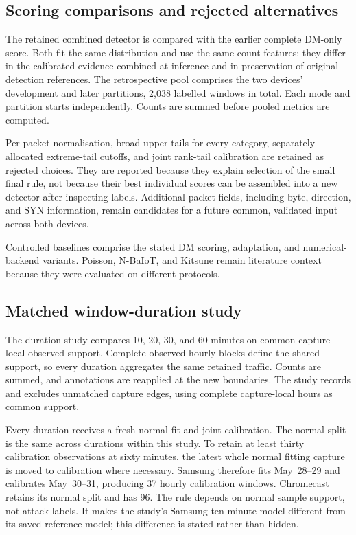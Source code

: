 \subsection{Scoring comparisons and rejected alternatives}

The retained combined detector is compared with the earlier complete
DM-only score. Both fit the same distribution and use the same count
features; they differ in the calibrated evidence combined at inference
and in preservation of original detection references. The retrospective
pool comprises the two devices' development and later partitions,
2,038 labelled windows in total. Each mode and partition starts
independently. Counts are summed before pooled metrics are computed.

Per-packet normalisation, broad upper tails for every category,
separately allocated extreme-tail cutoffs, and joint rank-tail calibration
are retained as rejected choices. They are reported because they explain
selection of the small final rule, not because their best individual
scores can be assembled into a new detector after inspecting labels.
Additional packet fields, including byte, direction, and SYN information,
remain candidates for a future common, validated input across both devices.

Controlled baselines comprise the stated DM scoring, adaptation, and
numerical-backend variants. Poisson, N-BaIoT, and Kitsune remain literature
context because they were evaluated on different protocols.

\subsection{Matched window-duration study}

The duration study compares 10, 20, 30, and 60 minutes on common
capture-local observed support. Complete observed hourly blocks define
the shared support, so every duration aggregates the same retained traffic.
Counts are summed, and annotations are reapplied at the new boundaries.
The study records and excludes unmatched capture edges, using complete
capture-local hours as common support.

Every duration receives a fresh normal fit and joint calibration. The
normal split is the same across durations within this study. To retain
at least thirty calibration observations at sixty minutes, the latest
whole normal fitting capture is moved to calibration where necessary.
Samsung therefore fits May~28--29 and calibrates May~30--31, producing
37 hourly calibration windows. Chromecast retains its normal split and
has 96. The rule depends on normal sample support, not attack labels.
It makes the study's Samsung ten-minute model different from its saved
reference model; this difference is stated rather than hidden.

